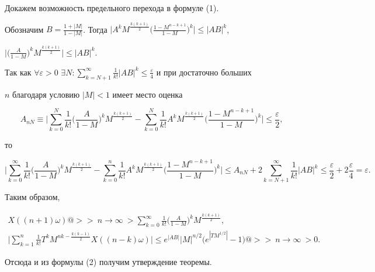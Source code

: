 \begin{pf} 


Докажем возможность предельного перехода в формуле (1). 


Обозначим $B=\frac{1+|M|}{1-|M|}$. Тогда $\big| A^k 


M^{\frac{k(k+1)}{2}}\big(\frac{1-M^{n-k+1}}{1-M}\big)^k\big|\le |AB|^k$, 


$\big|\big(\frac{A}{1-M}\big)^k M^{\frac{k(k+1)}{2}}\big|\le |AB|^k$. 


Так как $\forall\varepsilon>0$ $\exists N:\sum\limits^\infty_{k=N+1} 


\frac{1}{k!}|AB|^k\le \frac{\varepsilon}{4}$ и при достаточно больших 


$n$ благодаря условию $|M|<1$ имеет место оценка 


$$ 


A_{n N}\equiv\bigg|\sum^N_{k=0}\frac{1}{k!} 


\bigg(\frac{A}{1-M} \bigg)^k M^{\frac{k(k+1)}{2}}- 


\sum^N_{k=0}\frac{1}{k!}A^k M^{\frac{k(k+1)}{2}} 


\bigg(\frac{1-M^{n-k+1}}{1-M} \bigg)^k\bigg|\le\frac{\varepsilon}{2}, 


$$ 


то 


$$ 


\bigg|\sum^\infty_{k=0}\frac{1}{k!} 


\bigg(\frac{A}{1-M} \bigg)^k M^{\frac{k(k+1)}{2}} 


-\sum^n_{k=0}\frac{1}{k!}A^k M^{\frac{k(k+1)}{2}} 


\bigg(\frac{1-M^{n-k+1}}{1-M} \bigg)^k\bigg|\le 


A_{n N}+2\sum^\infty_{k=N+1}\frac{1}{k!}|AB|^k\le 


\frac{\varepsilon}{2}+2\frac{\varepsilon}{4}=\varepsilon. 


$$ 


Таким образом, 


\begin{gather*} 


X((n+1)\omega)@>>{\ n\to\infty\ }> \sum^\infty_{k=0} 


\frac{1}{k!}\bigg(\frac{A}{1-M} \bigg)^k 


M^{\frac{k(k+1)}{2}}, \\ \bigg|\sum^n_{k=1}\frac{1}{k!}T^k 


M^{n k-\frac{k(k-1)}{2}}X((n-k)\omega)\bigg|\le 


e^{|AB|}|M|^{n/2}\big(e^{|TM^{1/2}|}-1\big) 


@>>{\ n\to\infty\ }>0. 


\end{gather*}  


Отсюда и из формулы (2) получим утверждение теоремы. 


\end{pf} 


